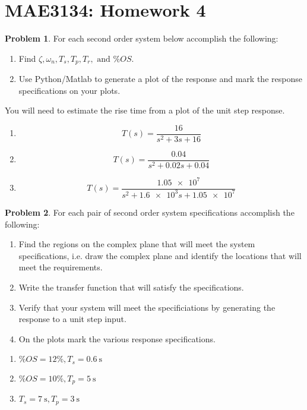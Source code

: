 \documentclass[10pt]{article}
\date{}
\theoremstyle{definition}
\newtheorem{prob}{Problem}[section]
\newenvironment{subprob}%
{\renewcommand{\theenumi}{\alph{enumi}}\renewcommand{\labelenumi}{(\theenumi)}\begin{enumerate}}%
{\end{enumerate}}%
\begin{document}
\pagestyle{empty}
\section*{MAE3134: Homework 4}
\vspace*{-0.4cm}

\begin{prob}
    For each second order system below accomplish the following:
    \begin{enumerate}
        \item Find \( \zeta , \omega_n, T_s, T_p, T_r, \text{ and } \% OS\).
        \item Use Python/Matlab to generate a plot of the response and mark the response specifications on your plots.
    \end{enumerate}
    You will need to estimate the rise time from a plot of the unit step response.
    \begin{subprob}
        \item \[ T(s) = \frac{16}{s^2 + 3s + 16}\]
        \item \[ T(s) = \frac{0.04}{s^2 + 0.02 s + 0.04}\]
        \item \[ T(s) = \frac{\num{1.05e7}}{s^2 + \num{1.6e3}s + \num{1.05e7}}\]
    \end{subprob}
\end{prob}

\begin{prob}
    For each pair of second order system specifications accomplish the following:
    \begin{enumerate}
        \item Find the regions on the complex plane that will meet the system specifications, i.e. draw the complex plane and identify the locations that will meet the requirements.
        \item Write the transfer function that will satisfy the specifications.
        \item Verify that your system will meet the specificiations by generating the response  to a unit step input.
        \item On the plots mark the various response specifications.
    \end{enumerate}
    \begin{subprob}
        \item \( \% OS = 12 \%, T_s = \SI{0.6}{\second}\)
        \item \( \% OS = 10 \%, T_p = \SI{5}{\second}\)
        \item \( T_s = \SI{7}{\second}, T_p = \SI{3}{\second}\)
    \end{subprob}
\end{prob}
\end{document}
